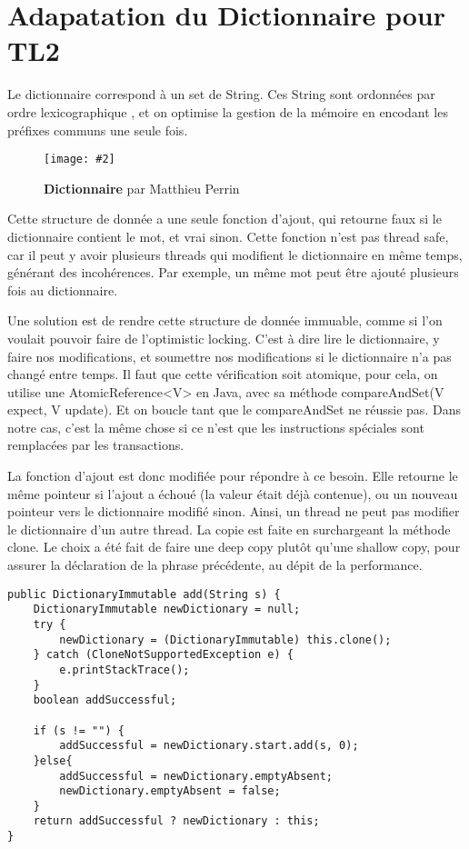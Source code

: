 \documentclass[10pt, a4paper]{article}
\newcommand{\figuremacro}[5]{
    \begin{figure}[#1]
        \centering
        \texttt{[image: \#2]}
        \caption[#3]{\textbf{#3}#4}
        \label{fig:#2}
    \end{figure}
}
\begin{document}
\section{Adapatation du Dictionnaire pour TL2}
Le dictionnaire correspond à un set de String. Ces String sont ordonnées par ordre lexicographique , et on optimise la gestion de la mémoire en encodant les préfixes communs une seule fois.

\figuremacro{h}{dico}{Dictionnaire}{ par Matthieu Perrin}{1.0}

Cette structure de donnée a une seule fonction d'ajout, qui retourne faux si le dictionnaire contient le mot, et vrai sinon. Cette fonction n'est pas thread safe, car il peut y avoir plusieurs threads qui modifient le dictionnaire en même temps, générant des incohérences. Par exemple, un même mot peut être ajouté plusieurs fois au dictionnaire.

Une solution est de rendre cette structure de donnée immuable, comme si l'on voulait pouvoir faire de l'optimistic locking. C'est à dire lire le dictionnaire, y faire nos modifications, et soumettre nos modifications si le dictionnaire n'a pas changé entre temps. Il faut que cette vérification soit atomique, pour cela, on utilise une AtomicReference<V> en Java, avec sa méthode compareAndSet(V expect, V update). Et on boucle tant que le compareAndSet ne réussie pas. Dans notre cas, c'est la même chose si ce n'est que les instructions spéciales sont remplacées par les transactions.

La fonction d'ajout est donc modifiée pour répondre à ce besoin. Elle retourne le même pointeur si l'ajout a échoué (la valeur était déjà contenue), ou un nouveau pointeur vers le dictionnaire modifié sinon. Ainsi, un thread ne peut pas modifier le dictionnaire d'un autre thread. La copie est faite en surchargeant la méthode clone. Le choix a été fait de faire une deep copy plutôt qu'une shallow copy, pour assurer la déclaration de la phrase précédente, au dépit de la performance.
\begin{lstlisting}
public DictionaryImmutable add(String s) {
    DictionaryImmutable newDictionary = null;
    try {
        newDictionary = (DictionaryImmutable) this.clone();
    } catch (CloneNotSupportedException e) {
        e.printStackTrace();
    }
    boolean addSuccessful;

    if (s != "") {
        addSuccessful = newDictionary.start.add(s, 0);
    }else{
        addSuccessful = newDictionary.emptyAbsent;
        newDictionary.emptyAbsent = false;
    }
    return addSuccessful ? newDictionary : this;
}
\end{lstlisting}
\end{document}
